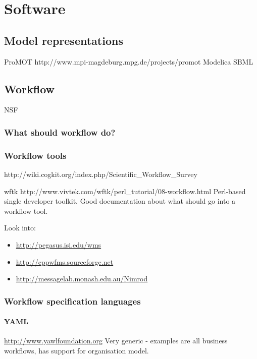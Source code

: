 \chapter{Software}

\section{Model representations}

ProMOT http://www.mpi-magdeburg.mpg.de/projects/promot
Modelica
SBML

\section{Workflow}
NSF 

\subsection{What should workflow do?}

\subsection{Workflow tools}

http://wiki.cogkit.org/index.php/Scientific_Workflow_Survey


wftk http://www.vivtek.com/wftk/perl_tutorial/08-workflow.html
Perl-based single developer toolkit.  Good documentation about what
should go into a workflow tool.

Look into:
\begin{itemize}
\item \url{http://pegasus.isi.edu/wms}
\item \url{http://cppwfms.sourceforge.net}
\item \url{http://messagelab.monash.edu.au/Nimrod}
\end{itemize}

\subsection{Workflow specification languages}

\subsubsection{YAML}
\url{http://www.yawlfoundation.org} Very generic - examples are all
business workflows, has support for organisation model.  

